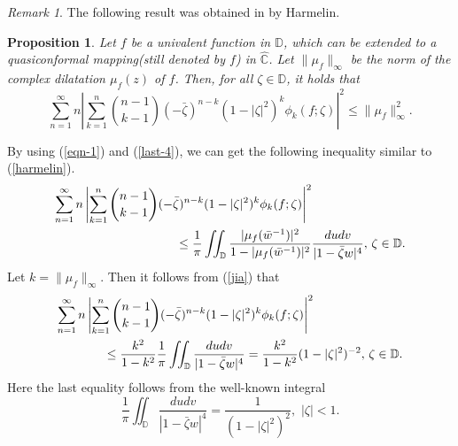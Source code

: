 \documentclass[10pt]{amsart}
\newtheorem{proposition}[theorem]{Proposition}
\theoremstyle{definition}
\theoremstyle{remark}
\newtheorem{remark}[theorem]{Remark}
\numberwithin{equation}{section}
\begin{document}
\begin{remark}
The following result was obtained in \cite[Lemma 5]{Ha-1} by Harmelin.
\begin{proposition}
Let $f$ be a univalent function in $\mathbb{D}$, which can be extended to a quasiconformal mapping(still denoted by $f$) in $\widehat{\mathbb{C}}$. Let $\|\mu_f\|_{\infty}$ be the norm of the complex dilatation $\mu_f(z)$ of $f$. Then, for all $\zeta\in \mathbb{D}$, it holds that 
\begin{equation}\label{harmelin}
\sum_{n=1}^{\infty}n\left|\sum_{k=1}^n \binom{n-1}{k-1} (-\bar{\zeta})^{n-k}(1-|\zeta|^2)^{k}\phi_k(f; \zeta)\right|^2\leq \|\mu_f\|_{\infty}^2.
\end{equation}
\end{proposition}
By using (\ref{eqn-1}) and (\ref{last-4}), we can get the following inequality similar to (\ref{harmelin}).
\begin{eqnarray}\label{jia}
\lefteqn{\sum_{n=1}^{\infty}n\left|\sum_{k=1}^n \binom{n-1}{k-1} (-\bar{\zeta})^{n-k}(1-|\zeta|^2)^{k}\phi_k(f; \zeta)\right|^2}  \\
 &&\quad\quad\quad\quad\quad \quad\quad \quad\quad  \leq
\frac{1}{\pi}\iint_{\mathbb{D}} \frac{|\mu_{f}({\bar{w}}^{-1})|^2}{1-|\mu_f({\bar{w}}^{-1})|^2}\frac{dudv}{|1-\bar{\zeta}w|^4},\, \zeta\in \mathbb{D}.\nonumber
\end{eqnarray}
Let $k=\|\mu_f\|_{\infty}$. Then it follows from (\ref{jia}) that 
\begin{eqnarray} 
\lefteqn{\sum_{n=1}^{\infty}n\left|\sum_{k=1}^n \binom{n-1}{k-1} (-\bar{\zeta})^{n-k}(1-|\zeta|^2)^{k}\phi_k(f; \zeta)\right|^2} \nonumber \\
 &&\quad\quad\quad \leq \frac{k^2}{1-k^2}\frac{1}{\pi}\iint_{\mathbb{D}}\frac{dudv}{|1-\bar{\zeta}w|^4}=\frac{k^2}{1-k^2}(1-|\zeta|^2)^{-2},\, \zeta\in \mathbb{D}.\nonumber
\end{eqnarray}
Here the last equality follows from the well-known integral
\[
\frac{1}{\pi}\iint_{\mathbb{D}}\frac{dudv}{|1-\bar{\zeta}w|^4} = \frac{1}{(1-|\zeta|^2)^2},\,\, |\zeta|<1.
\]
\end{remark}
\end{document}
